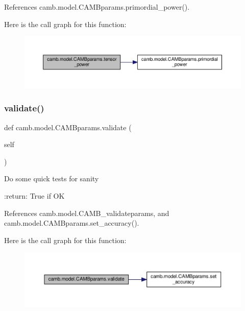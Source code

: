 References camb.\+model.\+C\+A\+M\+Bparams.\+primordial\+\_\+power().

Here is the call graph for this function\+:
\nopagebreak
\begin{figure}[H]
\begin{center}
\leavevmode
\includegraphics[width=350pt]{classcamb_1_1model_1_1CAMBparams_a846c38cbd0be48719f7ce15710e69523_cgraph}
\end{center}
\end{figure}
\mbox{\label{classcamb_1_1model_1_1CAMBparams_a25e629d6a0c1ff3c6ba9d6de2a8ef8fb}} 
\subsubsection{\texorpdfstring{validate()}{validate()}}
{\footnotesize\ttfamily def camb.\+model.\+C\+A\+M\+Bparams.\+validate (\begin{DoxyParamCaption}\item[{}]{self }\end{DoxyParamCaption})}

\begin{DoxyVerb}Do some quick tests for sanity

:return: True if OK
\end{DoxyVerb}
 

References camb.\+model.\+C\+A\+M\+B\+\_\+validateparams, and camb.\+model.\+C\+A\+M\+Bparams.\+set\+\_\+accuracy().

Here is the call graph for this function\+:
\nopagebreak
\begin{figure}[H]
\begin{center}
\leavevmode
\includegraphics[width=350pt]{classcamb_1_1model_1_1CAMBparams_a25e629d6a0c1ff3c6ba9d6de2a8ef8fb_cgraph}
\end{center}
\end{figure}


